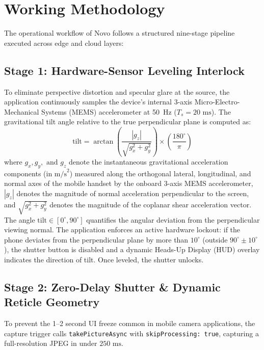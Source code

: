 \documentclass[12pt,a4paper,oneside]{report}
\begin{document}
\section{Working Methodology}
The operational workflow of Novo follows a structured nine-stage pipeline executed across edge and cloud layers:

\subsection{Stage 1: Hardware-Sensor Leveling Interlock}
To eliminate perspective distortion and specular glare at the source, the application continuously samples the device's internal 3-axis Micro-Electro-Mechanical Systems (MEMS) accelerometer at 50~Hz ($T_s = 20\text{~ms}$). The gravitational tilt angle relative to the true perpendicular plane is computed as:
\begin{equation}
\text{tilt} = \arctan\left(\frac{|g_z|}{\sqrt{g_x^2 + g_y^2}}\right) \times \left(\frac{180^\circ}{\pi}\right)
\end{equation}
where $g_x, g_y, \text{ and } g_z$ denote the instantaneous gravitational acceleration components (in $\text{m/s}^2$) measured along the orthogonal lateral, longitudinal, and normal axes of the mobile handset by the onboard 3-axis MEMS accelerometer, $|g_z|$ denotes the magnitude of normal acceleration perpendicular to the screen, and $\sqrt{g_x^2 + g_y^2}$ denotes the magnitude of the coplanar shear acceleration vector. The angle $\text{tilt} \in [0^\circ, 90^\circ]$ quantifies the angular deviation from the perpendicular viewing normal. The application enforces an active hardware lockout: if the phone deviates from the perpendicular plane by more than $10^\circ$ (outside $90^\circ \pm 10^\circ$), the shutter button is disabled and a dynamic Heads-Up Display (HUD) overlay indicates the direction of tilt. Once leveled, the shutter unlocks.

\subsection{Stage 2: Zero-Delay Shutter \& Dynamic Reticle Geometry}
To prevent the 1--2 second UI freeze common in mobile camera applications, the capture trigger calls \texttt{takePictureAsync} with \texttt{skipProcessing: true}, capturing a full-resolution JPEG in under $250\text{~ms}$. 
\end{document}
